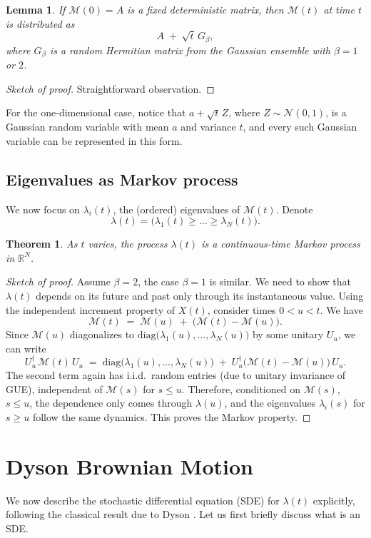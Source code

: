 \documentclass[letterpaper,11pt,oneside,reqno]{article}
\numberwithin{equation}{section}
\newcommand{\ssp}{\hspace{1pt}}
\newtheorem{lemma}[proposition]{Lemma}
\newtheorem{theorem}[proposition]{Theorem}
\theoremstyle{definition}
\begin{document}
\begin{lemma}
\label{lemma:time_fixed_law}
If $\mathcal{M}(0) = A$ is a fixed deterministic matrix, then $\mathcal{M}(t)$ at time $t$ is distributed as
\[
A \;+\;\sqrt{t}\, G_{\beta},
\]
where $G_{\beta}$ is a random Hermitian matrix from the Gaussian ensemble with $\beta=1$ or $2$.
\end{lemma}
\begin{proof}[Sketch of proof]
	Straightforward observation.
\end{proof}

For the one-dimensional case, notice that $a+\sqrt t\ssp Z$, where $Z\sim \mathcal{N}(0,1)$, is a Gaussian random variable with mean $a$ and variance $t$, and every such Gaussian variable can be represented in this form.

\subsection{Eigenvalues as Markov process}
We now focus on $\lambda_i(t)$, the (ordered) eigenvalues of $\mathcal{M}(t)$. Denote
\[
\lambda(t) = \bigl(\lambda_1(t)\ge \dots \ge \lambda_N(t)\bigr).
\]
\begin{theorem}
\label{thm:lambda_is_markov}
As $t$ varies, the process $\lambda(t)$ is a continuous-time Markov process in $\mathbb{R}^N$.
\end{theorem}
\begin{proof}[Sketch of proof]
	Assume $\beta=2$, the case $\beta=1$ is similar.
We need to show that $\lambda(t)$ depends on its future and past only through its instantaneous value. Using the independent increment property of $X(t)$, consider times $0< u< t$. We have
\[
\mathcal{M}(t) \;=\; \mathcal{M}(u)\;+\;\bigl(\mathcal{M}(t)-\mathcal{M}(u)\bigr).
\]
Since $\mathcal{M}(u)$ diagonalizes to $\mathrm{diag}\bigl(\lambda_1(u),\ldots,\lambda_N(u)\bigr)$ by some unitary $U_u$, we can write
\[
U_u^\dagger\,\mathcal{M}(t)\,U_u \;=\;\mathrm{diag}\bigl(\lambda_1(u),\ldots,\lambda_N(u)\bigr)\;+\; U_u^\dagger\bigl(\mathcal{M}(t)-\mathcal{M}(u)\bigr)\,U_u.
\]
The second term again has i.i.d.\ random entries (due to unitary invariance of
GUE), independent of $\mathcal{M}(s)$ for $s\le u$.
Therefore, conditioned on $\mathcal{M}(s)$, $s\le u$, the dependence only
comes through $\lambda(u)$, and the eigenvalues $\lambda_i(s)$ for $s\ge u$ follow
the same dynamics. This proves the Markov property.
\end{proof}

\section{Dyson Brownian Motion}
We now describe the stochastic differential equation (SDE)
for $\lambda(t)$ explicitly, following the classical result due to Dyson
\cite{dyson1962brownian}. Let us first briefly discuss what is an SDE.
\end{document}
